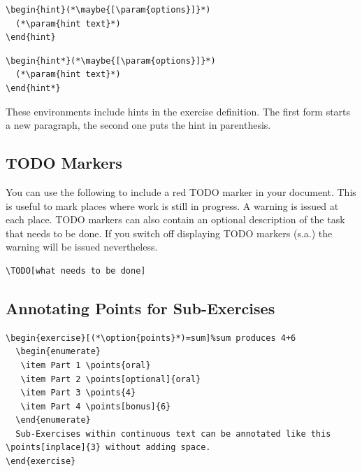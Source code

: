 \documentclass[DIV12,BCOR0mm]{scrartcl}
\newcommand{\param}[1]{$\langle${\normalfont\itshape #1\/}$\rangle$}
\newcommand{\maybe}[1]{\textcolor{green!50!black}{#1}}
\newcommand{\optionstyle}{\normalfont\ttfamily\color{red!50!black}}
\newcommand{\option}[1]{{\optionstyle #1}}
\begin{document}
\begin{lstlisting}
\begin{hint}(*\maybe{[\param{options}]}*)
  (*\param{hint text}*)
\end{hint}
\end{lstlisting}

\begin{lstlisting}
\begin{hint*}(*\maybe{[\param{options}]}*)
  (*\param{hint text}*)
\end{hint*}
\end{lstlisting}

These environments include hints in the exercise definition. The first form
starts a new paragraph, the second one puts the hint in parenthesis.

\subsection{TODO Markers}

You can use the following to include a red TODO marker in your document. This is
useful to mark places where work is still in progress. A warning is issued at
each place. TODO markers can also contain an optional description
of the task that needs to be done. If you switch off displaying
TODO markers (s.a.) the warning will be issued nevertheless.

\begin{lstlisting}
\TODO[what needs to be done]
\end{lstlisting}

\subsection{Annotating Points for Sub-Exercises}
\begin{lstlisting}
\begin{exercise}[(*\option{points}*)=sum]%sum produces 4+6
  \begin{enumerate}
   \item Part 1 \points{oral}
   \item Part 2 \points[optional]{oral}
   \item Part 3 \points{4}
   \item Part 4 \points[bonus]{6}
  \end{enumerate}
  Sub-Exercises within continuous text can be annotated like this \points[inplace]{3} without adding space.
\end{exercise}
\end{lstlisting}
\end{document}

